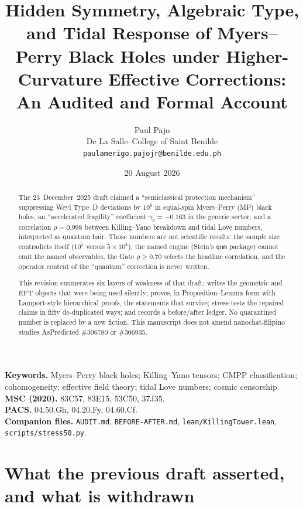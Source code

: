 \documentclass[11pt,a4paper]{article}
\title{Hidden Symmetry, Algebraic Type, and Tidal Response of
Myers--Perry Black Holes under Higher-Curvature Effective Corrections:
An Audited and Formal Account}
\author{Paul Pajo\\
De La Salle--College of Saint Benilde\\
\texttt{paulamerigo.pajojr@benilde.edu.ph}}
\date{20 August 2026}
\begin{document}
\maketitle

\begin{abstract}
The 23~December~2025 draft claimed a ``semiclassical protection
mechanism'' suppressing Weyl Type~D deviations by \(10^6\) in equal-spin
Myers--Perry (MP) black holes, an ``accelerated fragility'' coefficient
\(\gamma_2=-0.163\) in the generic sector, and a correlation
\(\rho=0.998\) between Killing--Yano breakdown and tidal Love numbers,
interpreted as quantum hair. Those numbers are not scientific results:
the sample size contradicts itself (\(10^5\) versus \(5\times10^4\)),
the named engine (Stein's \texttt{qnm} package) cannot emit the named
observables, the Gate \(\rho\ge0.70\) selects the headline correlation,
and the operator content of the ``quantum'' correction is never written.

This revision enumerates six layers of weakness of that draft; writes
the geometric and EFT objects that were being used silently; proves, in
Proposition--Lemma form with Lamport-style hierarchical proofs, the
statements that survive; stress-tests the repaired claims in fifty
de-duplicated ways; and records a before/after ledger. No quarantined
number is replaced by a new fiction. This manuscript does not amend
nanochat-filipino studies AsPredicted \#306780 or \#306935.
\end{abstract}

\noindent\textbf{Keywords.} Myers--Perry black holes; Killing--Yano
tensors; CMPP classification; cohomogeneity; effective field theory;
tidal Love numbers; cosmic censorship.\\
\textbf{MSC (2020).} 83C57, 83E15, 53C50, 37J35.\\
\textbf{PACS.} 04.50.Gh, 04.20.Fy, 04.60.Cf.\\
\textbf{Companion files.} \texttt{AUDIT.md}, \texttt{BEFORE-AFTER.md},
\texttt{lean/KillingTower.lean}, \texttt{scripts/stress50.py}.

\tableofcontents

\section{What the previous draft asserted, and what is withdrawn}
\end{document}
